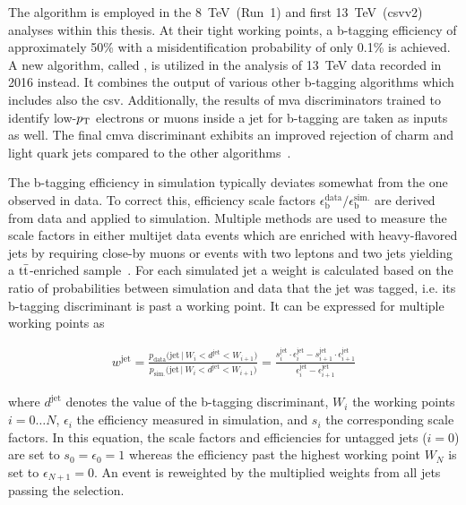 The  algorithm is employed in the 8~TeV~(Run~1) and first 13~TeV~(\gls{csv}v2) analyses within this thesis.  At their tight working points, a b-tagging efficiency of approximately 50\% with a misidentification probability of only 0.1\% is achieved. A new algorithm, called , is utilized in the analysis of 13~TeV data recorded in 2016 instead. It combines the output of various other b-tagging algorithms which includes also the \gls{csv}. Additionally, the results of \gls{mva} discriminators trained to identify low-$p_\mathrm{T}$ electrons or muons inside a jet for b-tagging are taken as inputs as well. The final \gls{cmva} discriminant exhibits an improved rejection of charm and light quark jets compared to the other algorithms~\cite{CMS-PAS-BTV-15-001}.

The b-tagging efficiency in simulation typically deviates somewhat from the one observed in data. To correct this, efficiency scale factors $\epsilon_\mathrm{b}^\mathrm{data}/\epsilon_\mathrm{b}^\mathrm{sim.}$ are derived from data and applied to simulation. Multiple methods are used to measure the scale factors in either multijet data events which are enriched with heavy-flavored jets by requiring close-by muons or events with two leptons and two jets yielding a $\mathrm{t}\bar{\mathrm{t}}$-enriched sample~\cite{CMS-PAS-BTV-13-001}. For each simulated jet a weight is calculated based on the ratio of probabilities between simulation and data that the jet was tagged, i.e. its b-tagging discriminant is past a working point. It can be expressed for multiple working points as

\begin{align}
w^\mathrm{jet}=\frac{p_\mathrm{data}\big(\mathrm{jet}\,\big|~W_{i}<d^\mathrm{jet}<W_{i+1}\big)}{p_\mathrm{sim.}\big(\mathrm{jet}\,\big|~W_{i}<d^\mathrm{jet}<W_{i+1}\big)}
=\frac{
s^\mathrm{jet}_{i}\cdot\epsilon^\mathrm{jet}_{i}-s^\mathrm{jet}_{i+1}\cdot\epsilon^\mathrm{jet}_{i+1}}{\epsilon^\mathrm{jet}_{i}-\epsilon^\mathrm{jet}_{i+1}}
\end{align}

where $d^\mathrm{jet}$ denotes the value of the b-tagging discriminant, $W_{i}$ the working points $i=0\ldots N$, $\epsilon_i$ the efficiency measured in simulation, and $s_i$ the corresponding scale factors. In this equation, the scale factors and efficiencies for untagged jets ($i=0$) are set to $s_{0}=\epsilon_{0}=1$ whereas the efficiency past the highest working point $W_N$ is set to $\epsilon_{N+1}=0$. An event is reweighted by the multiplied weights from all jets passing the selection.


